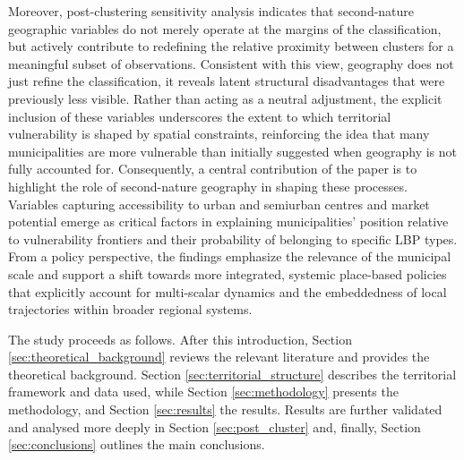 \documentclass[a4paper,11pt,oneside]{article}
\begin{document}
Moreover, post-clustering sensitivity analysis indicates that second-nature geographic variables do not merely operate at the margins of the classification, but actively contribute to redefining the relative proximity between clusters for a meaningful subset of observations. Consistent with this view, geography does not just refine the classification, it reveals latent structural disadvantages that were previously less visible. Rather than acting as a neutral adjustment, the explicit inclusion of these variables underscores the extent to which territorial vulnerability is shaped by spatial constraints, reinforcing the idea that many municipalities are more vulnerable than initially suggested when geography is not fully accounted for. Consequently, a central contribution of the paper is to highlight the role of second-nature geography in shaping these processes. Variables capturing accessibility to urban and semiurban centres and market potential emerge as critical factors in explaining municipalities’ position relative to vulnerability frontiers and their probability of belonging to specific LBP types. From a policy perspective, the findings emphasize the relevance of the municipal scale and support a shift towards more integrated, systemic place-based policies that explicitly account for multi-scalar dynamics and the embeddedness of local trajectories within broader regional systems.





The study proceeds as follows. After this introduction, Section \ref{sec:theoretical_background} reviews the relevant literature and provides the theoretical background. Section \ref{sec:territorial_structure} describes the territorial framework and data used, while Section \ref{sec:methodology} presents the methodology, and Section \ref{sec:results} the results. Results are further validated and analysed more deeply in Section \ref{sec:post_cluster} and, finally, Section \ref{sec:conclusions} outlines the main conclusions.



\end{document}

